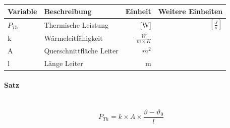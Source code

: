 \documentclass[a4paper,10pt]{article}
\newcommand{\lbparagraph}[1]{\paragraph{#1}\mbox{}\\}
\begin{document}
\begin{tabular}{l|l|r|r}
    Variable & Beschreibung & Einheit & Weitere Einheiten \\
    \hline
    $P_{Th}$ & Thermische Leistung & [W] & $[\frac{J}{s}]$ \\
    k & Wärmeleitfähigkeit & $\frac{W}{m \times K}$ & \\
    A & Querschnittfläche Leiter & $m^2$ & \\
    l & Länge Leiter & m &
\end{tabular}

\lbparagraph{Satz}

\begin{equation}
    P_{Th} = k \times A \times \frac{\vartheta - {\vartheta}_0}{l}
\end{equation}
\end{document}
